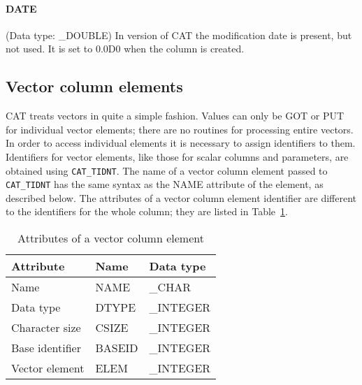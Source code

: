 \paragraph{DATE}
(Data type: \_DOUBLE)
In version \CATversion of CAT the modification date is present, but 
not used. It is set to 0.0D0 when the column is created.


\subsection{\label{COLUMN_ELM}Vector column elements}

CAT treats vectors in quite a simple fashion. Values can only be GOT
or PUT for individual vector elements; there are no routines for 
processing entire vectors. In order to access individual elements it
is necessary to assign identifiers to them. Identifiers for vector
elements, like those for scalar columns and parameters, are obtained
using {\tt CAT\_TIDNT}. The name of a vector column element passed to
{\tt CAT\_TIDNT} has the same syntax as the NAME attribute of the
element, as described below. The attributes of a vector column element
identifier are different to the identifiers for the whole column; they
are listed in Table~\ref{VCOL_ELEM}.

\begin{table}[htbp]

\begin{center}
\begin{tabular}{lll}
Attribute       & Name    & Data type  \\ \hline
Name            & NAME    & \_CHAR     \\
Data type       & DTYPE   & \_INTEGER  \\
Character size  & CSIZE   & \_INTEGER  \\
Base identifier & BASEID  & \_INTEGER  \\
Vector element  & ELEM    & \_INTEGER  \\
\end{tabular}
\end{center}

\caption{\label{VCOL_ELEM}Attributes of a vector column element}

\end{table}

